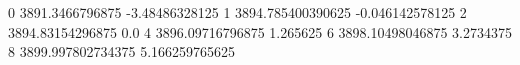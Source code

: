 0 3891.3466796875 -3.48486328125
1 3894.785400390625 -0.046142578125
2 3894.83154296875 0.0
4 3896.09716796875 1.265625
6 3898.10498046875 3.2734375
8 3899.997802734375 5.166259765625

